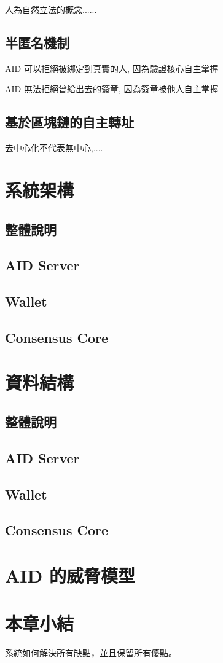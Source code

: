 人為自然立法的概念......

\subsection{半匿名機制}

AID 可以拒絕被綁定到真實的人, 因為驗證核心自主掌握

AID 無法拒絕曾給出去的簽章, 因為簽章被他人自主掌握

\subsection{基於區塊鏈的自主轉址}

去中心化不代表無中心,....

\section{系統架構}
\subsection{整體說明}
\subsection{AID Server}
\subsection{Wallet}
\subsection{Consensus Core}

\section{資料結構}
\subsection{整體說明}
\subsection{AID Server}
\subsection{Wallet}
\subsection{Consensus Core}

\section{AID 的威脅模型}

\section{本章小結}

系統如何解決所有缺點，並且保留所有優點。